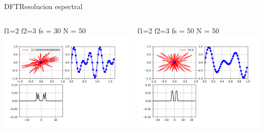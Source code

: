 \begin{frame}{DFT}{Resolucion espectral}
   \handsonicon
   \begin{columns}[t]
      \begin{column}{.5\textwidth}
         f1=2 \hspace{0.1cm}  f2=3 \hspace{0.1cm} fs = 30 \hspace{0.1cm} N  = 50\\
         \centering\includegraphics[width=1.0\textwidth]{3_clase/resolucion1}
      \end{column}
      \begin{column}{.5\textwidth}
         f1=2 \hspace{0.1cm}  f2=3 \hspace{0.1cm} fs = 50 \hspace{0.1cm} N  = 50\\
         \centering\includegraphics[width=1.0\textwidth]{3_clase/resolucion2}
      \end{column}
   \end{columns}
   \vfill
\end{frame}
